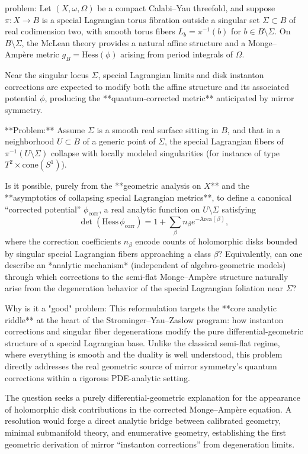 problem:  
Let \( (X,\omega,\Omega) \) be a compact Calabi–Yau threefold, and suppose \( \pi: X \to B \) is a special Lagrangian torus fibration outside a singular set \( \Sigma \subset B \) of real codimension two, with smooth torus fibers \( L_b = \pi^{-1}(b) \) for \( b \in B \setminus \Sigma \).  
On \( B \setminus \Sigma \), the McLean theory provides a natural affine structure and a Monge–Ampère metric \( g_B = \mathrm{Hess}(\phi) \) arising from period integrals of \( \Omega \).  

Near the singular locus \( \Sigma \), special Lagrangian limits and disk instanton corrections are expected to modify both the affine structure and its associated potential \( \phi \), producing the **quantum-corrected metric** anticipated by mirror symmetry.

**Problem:**  
Assume \( \Sigma \) is a smooth real surface sitting in \(B\), and that in a neighborhood \( U \subset B\) of a generic point of \( \Sigma \), the special Lagrangian fibers of \( \pi^{-1}(U\setminus\Sigma) \) collapse with locally modeled singularities (for instance of type \(T^2 \times \text{cone}(S^1)\)).   

Is it possible, purely from the **geometric analysis on \(X\)** and the **asymptotics of collapsing special Lagrangian metrics**, to define a canonical “corrected potential” \( \phi_{\mathrm{corr}} \), a real analytic function on \( U \setminus \Sigma \) satisfying  
\[
\det(\mathrm{Hess}\,\phi_{\mathrm{corr}}) = 1 + \sum_{\beta} n_{\beta} e^{-\mathrm{Area}(\beta)},
\]
where the correction coefficients \(n_\beta\) encode counts of holomorphic disks bounded by singular special Lagrangian fibers approaching a class \(\beta\)?   
Equivalently, can one describe an *analytic mechanism* (independent of algebro-geometric models) through which corrections to the semi-flat Monge–Ampère structure naturally arise from the degeneration behavior of the special Lagrangian foliation near \(\Sigma\)?

Why is it a "good" problem:  
This reformulation targets the **core analytic riddle** at the heart of the Strominger–Yau–Zaslow program: how instanton corrections and singular fiber degenerations modify the pure differential-geometric structure of a special Lagrangian base. Unlike the classical semi-flat regime, where everything is smooth and the duality is well understood, this problem directly addresses the real geometric source of mirror symmetry’s quantum corrections within a rigorous PDE-analytic setting.  

The question seeks a purely differential-geometric explanation for the appearance of holomorphic disk contributions in the corrected Monge–Ampère equation. A resolution would forge a direct analytic bridge between calibrated geometry, minimal submanifold theory, and enumerative geometry, establishing the first geometric derivation of mirror “instanton corrections” from degeneration limits.  

